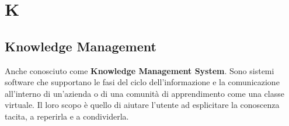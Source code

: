 \chapter{K}

\section{Knowledge Management}
Anche conosciuto come \textbf{Knowledge Management System}. Sono sistemi software che supportano le fasi del ciclo dell'informazione e la comunicazione all'interno di un'azienda o di una comunità di apprendimento come una classe virtuale. Il loro scopo è quello di aiutare l'utente ad esplicitare la conoscenza tacita, a reperirla e a condividerla.